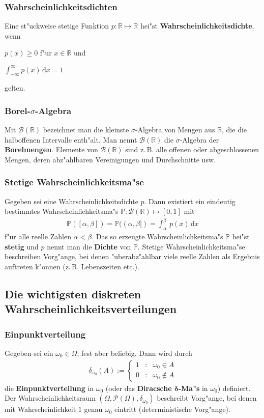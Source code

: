 \documentclass[ngerman,draft,parskip=half,twoside]{scrartcl}
\newcommand*{\R}{\mathbb{R}}      %
\newcommand*{\BorelM}{\mathcal{B}}  %
\newcommand*{\PotM}{\mathcal{P}}    %
\newcommand*{\WKM}{\mathbb{P}}      %
\begin{document}
\subsubsection{Wahrscheinlichkeitsdichten}
Eine st"uckweise stetige Funktion $p\colon\R\mapsto\R$ hei"st
\textbf{Wahrscheinlichkeitsdichte}, wenn
\begin{eigenschaften}
 \item $p(x)\ge 0$ f"ur $x\in\R$ und
 \item $\int_{-\infty}^\infty p(x)\,\mathrm d x=1$
\end{eigenschaften}
gelten.
\subsubsection{Borel-$\sigma$-Algebra}
Mit $\BorelM(\R)$ bezeichnet man die kleinste $\sigma$-Algebra von Mengen aus $\R$, die
die halboffenen Intervalle enth"alt. Man nennt $\BorelM(\R)$ die $\sigma$-Algebra der
\textbf{Borelmengen}. Elemente von $\BorelM(\R)$ sind z.\,B. alle offenen oder abgeschlossenen Mengen,
deren abz"ahlbaren Vereinigungen und Durchschnitte usw.
\subsubsection{Stetige Wahrscheinlichkeitsma"se}
Gegeben sei eine Wahrscheinlichkeitsdichte $p$. Dann existiert ein eindeutig bestimmtes
Wahrscheinlichkeitsma"s $\WKM \colon\BorelM(\R)\mapsto [0,1]$ mit
\begin{gather*}
  \WKM([\alpha,\beta])=\WKM((\alpha,\beta])=\int_\alpha^\beta\,p(x)\,\mathrm dx
\end{gather*}
f"ur alle reelle Zahlen $\alpha<\beta$. Das so erzeugte Wahrscheinlichkeitsma"s $\WKM$ hei"st \textbf{stetig}
und $p$ nennt man die \textbf{Dichte} von $\WKM$. Stetige Wahrscheinlichkeitsma"se beschreiben Vorg"ange,
bei denen "uberabz"ahlbar viele reelle Zahlen als Ergebnis auftreten k"onnen (z.\,B. Lebenszeiten etc.).
\subsection{Die wichtigsten diskreten Wahrscheinlichkeitsverteilungen}

\subsubsection{Einpunktverteilung}
Gegeben sei ein $\omega_0\in \Omega$, fest aber beliebig. Dann wird
durch
\begin{gather*}
  \delta_{\omega_0}(A):=\left\{
     \begin{array}{rcl}
       1 &:& \omega_0\in A\\
       0 &:& \omega_0\notin A
     \end{array}
     \right.
\end{gather*}
die \textbf{Einpunktverteilung} in $\omega_0$ (oder das \textbf{Diracsche $\mathbf \delta$-Ma"s} in
$\omega_0$) definiert. Der Wahrscheinlichkeitsraum $(\Omega,\PotM(\Omega),\delta_{\omega_0})$
beschreibt Vorg"ange, bei denen mit Wahrscheinlichkeit $1$ genau $\omega_0$ eintritt (deterministische
Vorg"ange).
\end{document}
